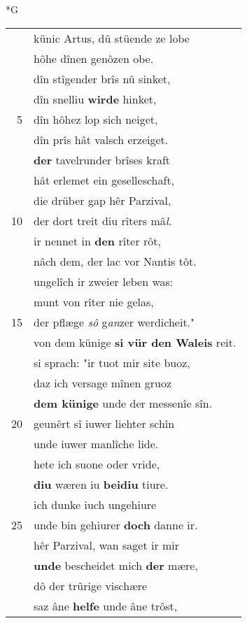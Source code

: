 \documentclass[8pt,a4paper,notitlepage]{article}
\begin{document}
\begin{table}[ht]
\begin{minipage}[t]{0.5\linewidth}
\small
\begin{center}*G
\end{center}
\begin{tabular}{rl}
 & künic Artus, dû stüende ze lobe\\ 
 & hôhe dînen genôzen obe.\\ 
 & dîn stîgender brîs nû sinket,\\ 
 & dîn snelliu \textbf{wirde} hinket,\\ 
5 & dîn hôhez lop sich neiget,\\ 
 & dîn prîs hât valsch erzeiget.\\ 
 & \textbf{der} tavelrunder brîses kraft\\ 
 & hât erlemet ein geselleschaft,\\ 
 & die drüber gap hêr Parzival,\\ 
10 & der dort treit diu rîters mâ\textit{l}.\\ 
 & ir nennet in \textbf{den} rîter rôt,\\ 
 & nâch dem, der lac vor Nantis tôt.\\ 
 & ungelîch ir zweier leben was:\\ 
 & munt von rîter nie gelas,\\ 
15 & der pflæge \textit{sô} g\textit{an}zer werdicheit."\\ 
 & von dem künige \textbf{si vür den Waleis} reit.\\ 
 & si sprach: "ir tuot mir site buoz,\\ 
 & daz ich versage mînen gruoz\\ 
 & \textbf{dem künige} unde der messenîe sîn.\\ 
20 & geunêrt sî iuwer liehter schîn\\ 
 & unde iuwer manlîche lide.\\ 
 & hete ich suone oder vride,\\ 
 & \textbf{diu} wæren iu \textbf{beidiu} tiure.\\ 
 & ich dunke iuch ungehiure\\ 
25 & unde bin gehiurer \textbf{doch} danne ir.\\ 
 & hêr Parzival, wan saget ir mir\\ 
 & \textbf{unde} bescheidet mich \textbf{der} mære,\\ 
 & dô der trûrige vischære\\ 
 & saz âne \textbf{helfe} unde âne trôst,\\ 

\end{tabular}
\end{minipage}
\end{table}
\end{document}
